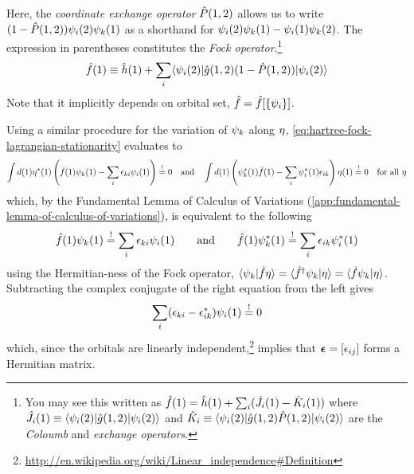 \documentclass[11pt]{article}
\numberwithin{equation}{section}
\begin{document}
Here, the \textit{coordinate exchange operator} $\hat{P}(1,2)$ allows us to write $(1-\hat{P}(1,2))\psi _i(2)\psi _k(1)$ as a shorthand for $\psi _i(2)\psi _k(1)-\psi _i(1)\psi _k(2)$.
The expression in parentheses constitutes the \textit{Fock operator}.\footnote{
You may see this written as
$\hat{f}(1)=\hat{h}(1)+\sum_i(\hat{J}_i(1)-\hat{K}_i(1))$
where $\hat{J}_i(1)\equiv\langle\psi _i(2)|\hat{g}(1,2)|\psi _i(2)\rangle$ and $\hat{K}_i\equiv\langle\psi _i(2)|\hat{g}(1,2)\hat{P}(1,2)|\psi _i(2)\rangle$ are the \textit{Coloumb} and \textit{exchange operators}.
}
\begin{align}
\label{fock}
  \hat{f}(1)
\equiv
  \hat{h}(1)
+\sum_i
  \langle\psi _i(2)|\hat{g}(1,2)(1-\hat{P}(1,2))|\psi _i(2)\rangle
\end{align}
Note that it implicitly depends on orbital set, $\hat{f}=\hat{f}[\{\psi _i\}]$.

Using a similar procedure for the variation of $\psi _k$ along $\eta $, \cref{eq:hartree-fock-lagrangian-stationarity} evaluates to
\begin{align*}
  \int
  d(1)
  \eta^*(1)
  \left(
    \hat{f}(1)\psi _k(1)
  -
    \sum_i
    \epsilon _{ki}
    \psi _i(1)
  \right)
\overset{!}=0
\hspace{10pt}
  \text{and}
\hspace{10pt}
  \int
  d(1)
  \left(
    \psi _k^*(1)
    \hat{f}(1)
  -
    \sum_i
    \psi _i^*(1)
    \epsilon _{ik}
  \right)
  \eta(1)
\overset{!}=0
\hspace{10pt}
  \text{for all $\eta $}
\end{align*}
which, by the Fundamental Lemma of Calculus of Variations (\cref{app:fundamental-lemma-of-calculus-of-variations}), is equivalent to the following
\begin{align}\label{eq:hartree-fock-penultimate-stationarity-condition}
  \hat{f}(1)
  \psi _k(1)
\overset{!}{=}
  \sum_i
  \epsilon _{ki}
  \psi _i(1)
\hspace{20pt}
  \text{and}
\hspace{20pt}
  \hat{f}(1)
  \psi _k^*(1)
\overset{!}{=}
  \sum_i
  \epsilon _{ik}
  \psi _i^*(1)
\end{align}
using the Hermitian-ness of the Fock operator, $\langle\psi _k|\hat{f}\eta\rangle=\langle\hat{f}^\dagger\psi _k|\eta\rangle=\langle\hat{f}\psi _k|\eta\rangle$.
Subtracting the complex conjugate of the right equation from the left gives
\begin{align*}
  \sum_i
  (\epsilon _{ki}-\epsilon _{ik}^*)\psi _i(1)
\overset{!}=
  0
\end{align*}
which, since the orbitals are linearly independent,\footnote{\url{http://en.wikipedia.org/wiki/Linear_independence\#Definition}}
implies that $\bm{\ev}=[\ev_{ij}]$ forms a Hermitian matrix.
\end{document}
